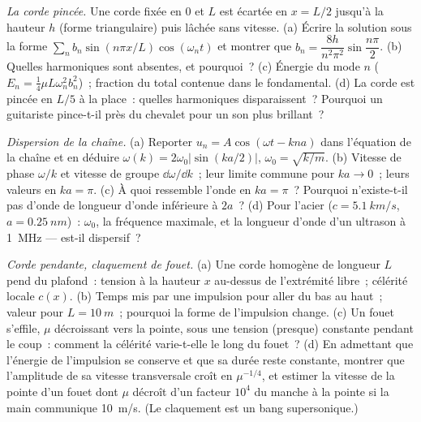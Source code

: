 \begin{exercise}[$\star\star\star$]\label{exo:b2:waves-on-strings:10}
\emph{La corde pincée.} Une corde fixée en $0$ et $L$ est écartée
en $x = L/2$ jusqu'à la hauteur $h$ (forme triangulaire) puis lâchée sans vitesse.
(a) Écrire la solution sous la forme $\sum_nb_n\sin(n\pi x/L)\cos(\omega_nt)$ et montrer
que $b_n = \dfrac{8h}{n^2\pi^2}\sin\dfrac{n\pi}2$. (b) Quelles harmoniques sont
absentes, et pourquoi~? (c) Énergie du mode $n$ ($E_n = \tfrac14\mu L\omega_n^2b_n^2$)~;
fraction du total contenue dans le fondamental. (d) La corde est pincée en
$L/5$ à la place~: quelles harmoniques disparaissent~? Pourquoi un guitariste pince-t-il près
du chevalet pour un son plus brillant~?
\end{exercise}

\begin{exercise}[$\star\star\star$]\label{exo:b2:waves-on-strings:11}
\emph{Dispersion de la chaîne.} (a) Reporter $u_n = A\cos(\omega t - kna)$ dans
l'équation de la chaîne et en déduire $\omega(k) = 2\omega_0|\sin(ka/2)|$, $\omega_0 =
\sqrt{k/m}$. (b) Vitesse de phase $\omega/k$ et vitesse de groupe $\dd\omega/\dd k$~;
leur limite commune pour $ka \to 0$~; leurs valeurs en $ka = \pi$. (c) À quoi
ressemble l'onde en $ka = \pi$~? Pourquoi n'existe-t-il pas d'onde de
longueur d'onde inférieure à $2a$~? (d) Pour l'acier ($c = \qty{5.1}{km/s}$, $a =
\qty{0.25}{nm}$)~: $\omega_0$, la fréquence maximale, et la longueur d'onde d'un
ultrason à \qty{1}{MHz} --- est-il dispersif~?
\end{exercise}

\begin{exercise}[$\star\star\star$]\label{exo:b2:waves-on-strings:12}
\emph{Corde pendante, claquement de fouet.} (a) Une corde homogène de longueur $L$
pend du plafond~: tension à la hauteur $x$ au-dessus de l'extrémité libre~; célérité
locale $c(x)$. (b) Temps mis par une impulsion pour aller du bas au
haut~; valeur pour $L = \qty{10}{m}$~; pourquoi la forme de l'impulsion change. (c) Un
fouet s'effile, $\mu$ décroissant vers la pointe, sous une tension (presque) constante
pendant le coup~: comment la célérité varie-t-elle le long du fouet~? (d)
En admettant que l'énergie de l'impulsion se conserve et que sa
durée reste constante, montrer que l'amplitude de sa vitesse transversale
croît en $\mu^{-1/4}$, et estimer la vitesse de la pointe d'un fouet dont
$\mu$ décroît d'un facteur $10^4$ du manche à la pointe si la main communique
\qty{10}{m/s}. (Le claquement est un bang supersonique.)
\end{exercise}

